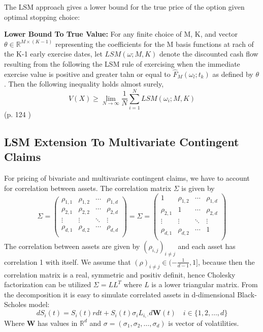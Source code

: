 The LSM approach gives a lower bound for the true price of the option given optimal stopping choice:
\theoremstyle{proposition}
\begin{proposition}{}\label{BS-price-EuroCall}
\textbf{Lower Bound To True Value:} For any finite choice of M, K, and vector $\theta\in \mathbb{R}^{M \times (K-1)}$ representing the coefficients for the M basis functions at rach of the K-1 early exercise dates, let $LSM(\omega;M,K)$ denote the discounted cash flow resulting from the following the LSM rule of exercising when the immediate exercise value is positive and greater tahn or equal to $\hat{F}_{M}(\omega_{l};t_{k})$ as defined by $\theta$. Then the following inequality holds almost surely,
$$V(X)\geq \lim_{N\to \infty} \dfrac{1}{N}\sum_{i=1}^{N} LSM(\omega_i;M,K)$$
(p. 124 \parencite{lsm})
\end{proposition}


\subsection{LSM Extension To Multivariate Contingent Claims}
For pricing of bivariate and multivariate contingent claims, we have to account for correlation between assets. The correlation matrix $\Sigma$ is given by
\begin{equation}
\Sigma = \begin{pmatrix}
\rho_{1,1} & \rho_{1,2} & \cdots & \rho_{1,d} \\
\rho_{2,1} & \rho_{2,2} & \cdots & \rho_{2,d} \\
\vdots & \vdots & \ddots & \vdots \\
\rho_{d,1} & \rho_{d,2} & \cdots & \rho_{d,d} \\
\end{pmatrix} = \Sigma = \begin{pmatrix}
1 & \rho_{1,2} & \cdots & \rho_{1,d} \\
\rho_{2,1} & 1 & \cdots & \rho_{2,d} \\
\vdots & \vdots & \ddots & \vdots \\
\rho_{d,1} & \rho_{d,2} & \cdots & 1 \\
\end{pmatrix}
\end{equation}
The correlation between assets are given by $(\rho_{i,j})_{i\neq j}$ and each asset has correlation 1 with itself. We assume that $(\rho)_{i \neq j} \in (-\frac{1}{d-1},1]$, because then the correlation matrix is a real, symmetric and positiv definit, hence Cholesky factorization can be utilized $\Sigma=LL^T$ where $L$ is a lower triangular matrix. From the decomposition it is easy to simulate correlated assets in d-dimensional Black-Scholes model:
\begin{equation}
dS_{i}(t)=S_{i}(t) r dt + S_{i}(t) \sigma_i L_{i,\cdot} d\bm{W}(t) \quad i \in \{1,2,\ldots, d\}
\end{equation}
Where $\bm{W}$ has values in $\mathbb{R}^d$ and $\sigma=(\sigma_1, \sigma_2, \ldots, \sigma_d)$ is vector of volatilities.\\

